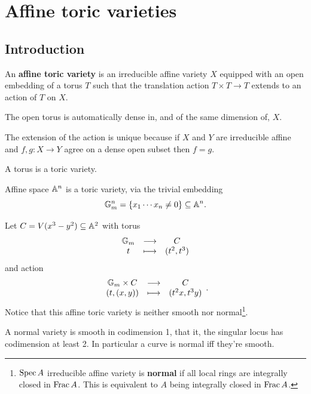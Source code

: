 \chapter{Affine toric varieties}

\section{Introduction}

\begin{definition}
An \textbf{affine toric variety} is an irreducible affine variety $X$ equipped with an open embedding of a torus $T$ such that the translation action $T\times T\to T$ extends to an action of $T$ on $X$.
\end{definition}

\begin{remark}
The open torus is automatically dense in, and of the same dimension of, $X$.
\end{remark}

\begin{remark}
The extension of the action is unique because if $X$ and $Y$ are irreducible affine and $f,g:X\to Y$ agree on a dense open subset then $f=g$.
\end{remark}

\begin{example}
A torus is a toric variety.
\end{example}

\begin{example}
Affine space $\mathbb{A}^n$ is a toric variety, via the trivial embedding 
\[\mathbb{G}_m^n=\left\{{x_1\cdots x_n\neq 0}\right\}\subseteq \mathbb{A}^n.\]
\end{example}

\begin{example}
Let $C=V(x^3-y^2)\subseteq \mathbb{A}^2$ with torus
\[\begin{array}{ccc} {\mathbb{G}_m} & \longrightarrow & {C}\\ {t} & \longmapsto & {(t^2,t^3)} \end{array}\]
and action
\[\begin{array}{ccc} {\mathbb{G}_m\times C} & \longrightarrow & {C}\\ {(t,(x,y))} & \longmapsto & {(t^2x,t^3y)} \end{array}.\]
Notice that this affine toric variety is neither smooth nor normal\footnote{$\operatorname{Spec} A$ irreducible affine variety is \textbf{normal} if all local rings are integrally closed in $\operatorname{Frac} A$. This is equivalent to $A$ being integrally closed in $\operatorname{Frac} A$.}.
\end{example}

\begin{fact}
A normal variety is smooth in codimension 1, that it, the singular locus has codimension at least 2. In particular a curve is normal iff they're smooth.
\end{fact}


